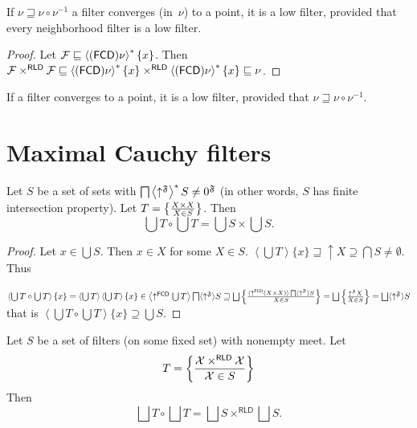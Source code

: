 \begin{prop}
  If $\nu \sqsupseteq \nu \circ \nu^{- 1}$ a filter converges (in~$\nu$) to a point, it is a low filter, provided that every
  neighborhood filter is a low filter.
\end{prop}

\begin{proof}
  Let $\mathcal{F} \sqsubseteq \left\langle (\mathsf{FCD}) \nu\right\rangle ^{\ast} \{ x \}$. Then $\mathcal{F} \times^{\mathsf{RLD}}
  \mathcal{F} \sqsubseteq \left\langle (\mathsf{FCD}) \nu\right\rangle ^{\ast} \{
  x \} \times^{\mathsf{RLD}} \left\langle (\mathsf{FCD}) \nu\right\rangle ^{\ast} \{ x \} \sqsubseteq \nu$.
\end{proof}

\begin{cor}
  If a filter converges to a point, it is a low filter, provided that $\nu
  \sqsupseteq \nu \circ \nu^{- 1}$.
\end{cor}

\section{Maximal Cauchy filters}

\begin{lem}
  Let $S$ be a set of sets with $\bigsqcap \left\langle  \uparrow^{\mathfrak{F}} \right\rangle ^{\ast}
  S \neq 0^{\mathfrak{F}}$ (in other words, $S$ has finite
  intersection property). Let $T = \left\{ \frac{ X \times X}{X \in S }\right\}$. Then
  \[ \bigcup T \circ \bigcup T = \bigcup S \times \bigcup S. \]
\end{lem}

\begin{proof}
  Let $x \in \bigcup S$. Then $x \in X$ for some $X \in S$. $\left\langle
  \bigcup T \right\rangle \{ x \} \sqsupseteq \uparrow X \supseteq \bigcap S
  \neq \emptyset$. Thus
  
  $\left\langle \bigcup T \circ \bigcup T \right\rangle \{ x \} = \left\langle
  \bigcup T \right\rangle \left\langle \bigcup T \right\rangle \{ x \} \in
  \left\langle \uparrow^{\mathsf{FCD}} \bigcup T \right\rangle
  \bigsqcap \langle \uparrow^{\mathfrak{F}} \rangle S \sqsupseteq \bigsqcup
  \setcond{ \langle \uparrow^{\mathsf{FCD}} (X \times X) \rangle
  \bigsqcap \langle \uparrow^{\mathfrak{F}} \rangle S }{
  X \in S } = \bigsqcup \setcond{ \uparrow^{\mathfrak{F}} X}{X \in S } =
  \bigsqcup \langle
  \uparrow^{\mathfrak{F}} \rangle S$ that is $\left\langle \bigcup T \circ
  \bigcup T \right\rangle \{ x \} \supseteq \bigcup S$.
\end{proof}

\begin{cor}
  Let $S$ be a set of filters (on some fixed set) with nonempty meet. Let
  \[ T = \left\{ \frac{ \mathcal{X} \times^{\mathsf{RLD}} \mathcal{X} }{\mathcal{X} \in S}\right\} \]
  Then
  \[ \bigsqcup T \circ \bigsqcup T = \bigsqcup S \times^{\mathsf{RLD}}
     \bigsqcup S. \]
\end{cor}

